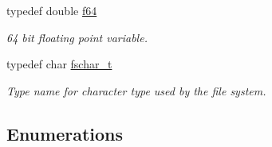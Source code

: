 \begin{DoxyCompactItemize}
typedef double \hyperlink{namespaceirr_a1325b02603ad449f92c68fc640af9b28}{f64}
\begin{DoxyCompactList}\small\item\em 64 bit floating point variable. \end{DoxyCompactList}\item 
typedef char \hyperlink{namespaceirr_a813cca9bac9fa0c1427d89720a451460}{fschar\+\_\+t}
\begin{DoxyCompactList}\small\item\em Type name for character type used by the file system. \end{DoxyCompactList}\end{DoxyCompactItemize}
\subsection*{Enumerations}
